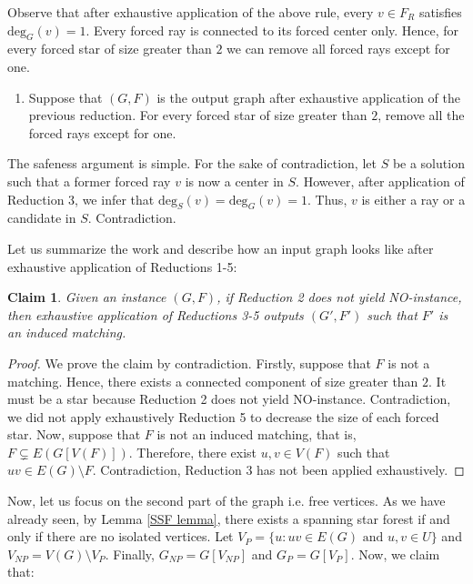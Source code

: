 \documentclass[en]{pracamgr}
\newtheorem{claim}{Claim}
\newcommand{\degree}[2]{\textrm{deg}_{#1}(#2)}
\begin{document}
Observe that after exhaustive application of the above rule, every $v \in F_R$ satisfies $\degree{G}{v}=1$. Every forced ray is connected to its forced center only. Hence, for every forced star of size greater than $2$ we can remove all forced rays except for one.

\begin{enumerate}[leftmargin=*,label=\textbf{Reduction \arabic{enumi}},resume,wide, labelwidth=!, labelindent=0pt]
	\item Suppose that $(G,F)$ is the output graph after exhaustive application of the previous reduction. For every forced star of size greater than $2$, remove all the forced rays except for one.
\end{enumerate}

The safeness argument is simple. For the sake of contradiction, let $S$ be a solution such that a former forced ray $v$ is now a center in $S$. However, after application of Reduction 3, we infer that $\degree{S}{v} = \degree{G}{v} = 1$. Thus, $v$ is either a ray or a candidate in $S$. Contradiction.

Let us summarize the work and describe how an input graph looks like after exhaustive application of Reductions 1-5:

\begin{claim}
	Given an instance $(G,F)$, if Reduction 2 does not yield NO-instance, then exhaustive application of Reductions 3-5 outputs $(G',F')$ such that $F'$ is an induced matching.
\end{claim}

\begin{proof}
	We prove the claim by contradiction. Firstly, suppose that $F$ is not a matching. Hence, there exists a connected component of size greater than $2$. It must be a star because Reduction 2 does not yield NO-instance. Contradiction, we did not apply exhaustively Reduction 5 to decrease the size of each forced star. Now, suppose that $F$ is not an induced matching, that is, $F \subsetneq E(G[V(F)])$. Therefore, there exist $u,v \in V(F)$ such that $uv \in E(G) \setminus F$. Contradiction, Reduction 3 has not been applied exhaustively.
\end{proof}

Now, let us focus on the second part of the graph i.e. free vertices. As we have already seen, by Lemma \ref{SSF lemma}, there exists a spanning star forest if and only if there are no isolated vertices. Let $V_P = \{u: uv \in E(G) \text{ and } u,v \in U\}$ and $V_{NP} = V(G) \setminus V_P$. Finally, $G_{NP} = G[V_{NP}]$ and $G_P = G[V_P]$. Now, we claim that:
\end{document}
